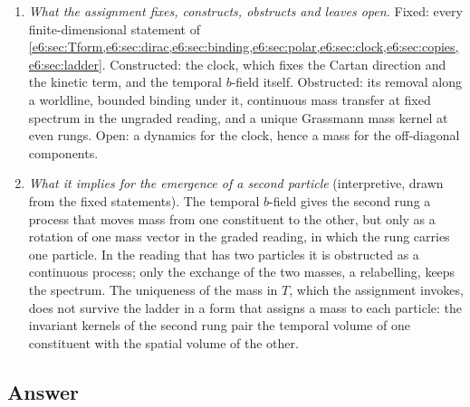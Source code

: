 \begin{remark}
\begin{enumerate}[label=(\alph*),leftmargin=2.2em]
term $g^2|[b,\langle\Phi\rangle]|^2$ of the Georgi--Glashow $SO(3)$ model \cite{GeorgiGlashowPRL72}, with the clock in the role of the Higgs vector
\cite{EnglertBrout64,Higgs64,Kibble67}: the two charge-flipping components would be massive and $J(n)$ massless. That needs a clock field $n(x)$ with a
covariant kinetic term, and the arena supplies none: a dynamics that selects the clock is open (Section~3 of \cite{TR}). Gauge invariance forbids a
bare mass term (inherited), and the Dirac mass gives none, since $\so3_+$ preserves $T$ (\cref{e6:prop:Tform}). In Remark~9.8(e) of \cite{RE} the rate matrix
played the role of the adjoint vacuum value; here the clock does.
\item \emph{What the assignment fixes, constructs, obstructs and leaves open.} Fixed: every finite-dimensional statement of
\cref{e6:sec:Tform,e6:sec:dirac,e6:sec:binding,e6:sec:polar,e6:sec:clock,e6:sec:copies,e6:sec:ladder}. Constructed: the clock, which fixes the Cartan
direction and the kinetic term, and the temporal $b$-field itself. Obstructed: its removal along a worldline, bounded binding under it, continuous mass
transfer at fixed spectrum in the ungraded reading, and a unique Grassmann mass kernel at even rungs. Open: a dynamics for the clock, hence a mass for the
off-diagonal components.
\item \emph{What it implies for the emergence of a second particle} (interpretive, drawn from the fixed statements). The temporal $b$-field gives the
second rung a process that moves mass from one constituent to the other, but only as a rotation of one mass vector in the graded reading, in which
the rung carries one particle. In the reading that has two particles it is obstructed as a continuous process; only
the exchange of the two masses, a relabelling, keeps the spectrum. The uniqueness of the mass in $T$, which the assignment invokes,
does not survive the ladder in a form that assigns a mass to each particle: the invariant kernels of the second rung pair the temporal volume of one
constituent with the spatial volume of the other.
\end{enumerate}
\end{remark}

\subsection{Answer}
\label{e6:sec:answer}

